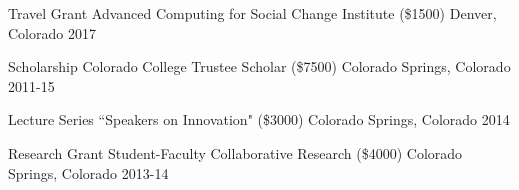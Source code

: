 
\begin{cvhonors}

  \cvhonor
    {Travel Grant} %
    {Advanced Computing for Social Change Institute (\$1500)} 
    {Denver, Colorado}
    {2017}

  \cvhonor
    {Scholarship}
    {Colorado College Trustee Scholar (\$7500)}
    {Colorado Springs, Colorado}
    {2011-15}

  \cvhonor
    {Lecture Series}
    {``Speakers on Innovation" (\$3000)}
    {Colorado Springs, Colorado}
    {2014}

  \cvhonor
    {Research Grant}
    {Student-Faculty Collaborative Research (\$4000)}
    {Colorado Springs, Colorado}
    {2013-14}
    
\end{cvhonors}
